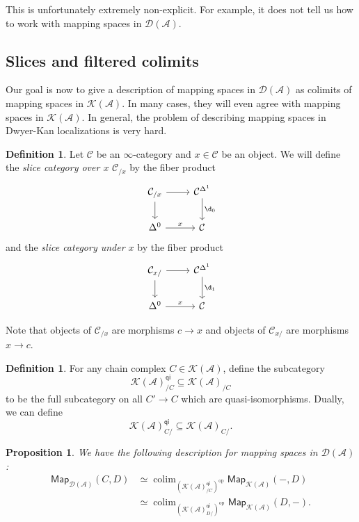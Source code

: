 \documentclass[10pt, oneside]{memoir}
\newtheorem{prop}[thm]{Proposition}
\theoremstyle{definition}
\newtheorem{defn}[thm]{Definition}
\theoremstyle{remark}
\theoremstyle{plain}
\theoremstyle{definition}
\theoremstyle{remark}
\newcommand{\mc}[1]{\mathcal{#1}}
\newcommand{\ms}[1]{\mathsf{#1}}
\newcommand{\1}{\mathbf{1}}
\newcommand{\2}{\mathbf{2}}
\newcommand{\3}{\mathbf{3}}
\DeclareMathOperator{\op}{op}
\DeclareMathOperator*{\colim}{colim}
\begin{document}
This is unfortunately extremely non-explicit. For example, it does not tell us how to work with mapping spaces in $\mc{D}(\mc{A})$.


\subsection{Slices and filtered colimits}%
\label{sub:Slices and filtered colimits}

Our goal is now to give a description of mapping spaces in $\mc{D}(\mc{A})$ as colimits of mapping spaces in $\mc{K}(\mc{A})$. In many cases, they will even agree with mapping spaces in $\mc{K}(\mc{A})$. In general, the problem of describing mapping spaces in Dwyer-Kan localizations is very hard.

\begin{defn}
    Let $\mc{C}$ be an $\infty$-category and $x \in \mc{C}$ be an object. We will define the \textit{slice category over $x$} $\mc{C}_{/x}$ by the fiber product
    \begin{equation*}
    \begin{tikzcd}
        \mc{C}_{/x} \ar{r} \ar{d} & \mc{C}^{\Delta^1} \ar{d}{\d_0} \\
        \Delta^0 \ar{r}{x} & \mc{C}
    \end{tikzcd}
    \end{equation*}
    and the \textit{slice category under $x$} by the fiber product
    \begin{equation*}
        \begin{tikzcd}
            \mc{C}_{x/} \ar{r} \ar{d} & \mc{C}^{\Delta^1} \ar{d}{\d_1} \\
            \Delta^0 \ar{r}{x} & \mc{C}
        \end{tikzcd}
    \end{equation*}
\end{defn}

Note that objects of $\mc{C}_{/x}$ are morphisms $c \to x$ and objects of $\mc{C}_{x/}$ are morphisms $x \to c$.

\begin{defn}
    For any chain complex $C \in \mc{K}(\mc{A})$, define the subcategory
    \[ \mc{K}(\mc{A})_{/C}^{\ms{qi}} \subseteq \mc{K}(\mc{A})_{/C} \]
    to be the full subcategory on all $C' \to C$ which are quasi-isomorphisms. Dually, we can define
    \[ \mc{K}(\mc{A})_{C/}^{\ms{qi}} \subseteq \mc{K}(\mc{A})_{C/}. \]
\end{defn}

\begin{prop}
    We have the following description for mapping spaces in $\mc{D}(\mc{A})$:
    \begin{align*}
        \ms{Map}_{\mc{D}(\mc{A})}(C, D) &\simeq \colim_{(\mc{K}(\mc{A})_{/C}^{\ms{qi}})^{\op}} \ms{Map}_{\mc{K}(\mc{A})}(-, D) \\
        &\simeq \colim_{(\mc{K}(\mc{A})_{D/}^{\ms{qi}})^{\op}} \ms{Map}_{\mc{K}(\mc{A})}(D, -).
    \end{align*}
\end{prop}
\end{document}
